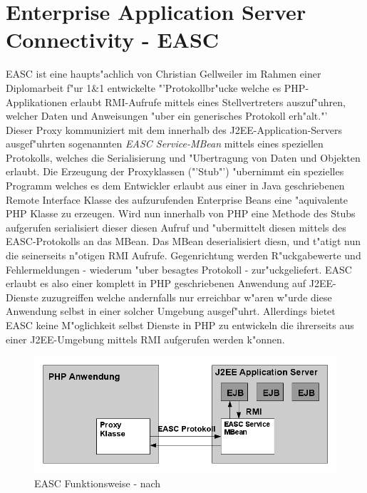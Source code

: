 \section{Enterprise Application Server Connectivity - EASC}
\label{sec:background:easc}
EASC ist eine haupts"achlich von Christian Gellweiler im Rahmen einer Diplomarbeit f"ur 1\&1 entwickelte 
"'Protokollbr"ucke welche es PHP-Applikationen erlaubt RMI-Aufrufe mittels eines Stellvertreters auszuf"uhren, welcher
Daten und Anweisungen "uber ein generisches Protokoll erh"alt."' \cite{EASC}\\
Dieser Proxy kommuniziert mit dem innerhalb des J2EE-Application-Servers ausgef"uhrten sogenannten \emph{EASC Service-MBean} mittels
eines speziellen Protokolls, welches die Serialisierung und "Ubertragung von Daten und Objekten erlaubt.
Die Erzeugung der Proxyklassen ("'Stub"') "ubernimmt ein spezielles Programm welches es dem Entwickler erlaubt aus einer in Java geschriebenen
Remote Interface Klasse des aufzurufenden Enterprise Beans eine "aquivalente PHP Klasse zu erzeugen.
Wird nun innerhalb von PHP eine Methode des Stubs aufgerufen serialisiert dieser diesen Aufruf und "ubermittelt diesen mittels des EASC-Protokolls
an das MBean. Das MBean deserialisiert diesn, und t"atigt nun die seinerseits n"otigen RMI Aufrufe.
Gegenrichtung werden R"uckgabewerte und Fehlermeldungen - wiederum "uber besagtes Protokoll - zur"uckgeliefert.
EASC erlaubt es also einer komplett in PHP geschriebenen Anwendung auf J2EE-Dienste zuzugreiffen welche andernfalls nur
erreichbar w"aren w"urde diese Anwendung selbst in einer solcher Umgebung ausgef"uhrt. Allerdings bietet EASC keine M"oglichkeit
selbst Dienste in PHP zu entwickeln die ihrerseits aus einer J2EE-Umgebung mittels RMI aufgerufen werden k"onnen.
\begin{figure}[h]
\includegraphics[width=\textwidth]{intro/img/easc.png}
\caption{EASC Funktionsweise - nach \cite{EASC}}
\label{fig:easc}
\end{figure}

